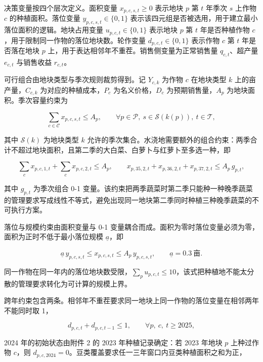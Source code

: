 \documentclass[bwprint]{gmcmthesis}
\begin{document}
决策变量按四个层次定义。面积变量 $x_{p,c,s,t}\ge 0$ 表示地块 $p$ 第 $t$ 年季次 $s$ 上作物 $c$ 的种植面积。落位变量 $y_{p,c,s,t}\in\{0,1\}$ 表示该四元组是否被选用，用于建立最小落位面积的逻辑。地块占用变量 $u_{p,c,t}\in\{0,1\}$ 表示地块 $p$ 第 $t$ 年是否种植作物 $c$，用于限制同一作物的落位地块数。轮作变量 $d_{p,c,t}\in\{0,1\}$ 表示作物 $c$ 第 $t$ 年是否落在地块 $p$ 上，用于表达相邻年不重茬。销售侧变量为正常销售量 $q_{c,t}$、超产量 $e_{c,t}$ 与销售收益 $r_{c,t}$。

可行组合由地块类型与季次规则裁剪得到。记 $Y_{c,k}$ 为作物 $c$ 在地块类型 $k$ 上的亩产量，$C_{c,k}$ 为对应的种植成本，$P_c$ 为名义价格，$D_c$ 为预期销售量，$A_p$ 为地块面积。季次容量约束为

\begin{equation}
\sum_{c\in\mathcal{C}} x_{p,c,s,t}\le A_p,\qquad \forall p\in\mathcal{P},\ s\in\mathcal{S}(k(p)),\ t\in\mathcal{T},
\end{equation}

其中 $\mathcal{S}(k)$ 为地块类型 $k$ 允许的季次集合。水浇地需要额外的组合约束：两季合计不超过地块面积，且第二季的大白菜、白萝卜与红萝卜至多选一种，即

\begin{equation}
\sum_{c} x_{p,c,1,t}+\sum_{c} x_{p,c,2,t}\le A_p,\qquad x_{p,35,2,t}+x_{p,36,2,t}+x_{p,37,2,t}\le A_p\, g_{p,t},
\end{equation}

其中 $g_{p,t}$ 为季次组合 0-1 变量。该约束把两季蔬菜时第二季只能种一种晚季蔬菜的管理要求写成线性不等式，避免出现同一地块第二季同时种植三种晚季蔬菜的不可执行方案。

落位与规模约束由面积变量与 0-1 变量耦合而成。面积为零时落位变量必须为零，面积为正时不低于最小落位规模 $\underline{a}$，即

\begin{equation}
\underline{a}\, y_{p,c,s,t}\le x_{p,c,s,t}\le A_p\, y_{p,c,s,t},\qquad \underline{a}=0.3\ \text{亩}.
\end{equation}

同一作物在同一年内的落位地块数受限，$\sum_{p}u_{p,c,t}\le 10$，该式把种植地不能太分散的管理要求转化为可计算的规模上界。

跨年约束包含两条。相邻年不重茬要求同一地块上同一作物的落位变量在相邻两年不能同时取 1，

\begin{equation}
d_{p,c,t}+d_{p,c,t-1}\le 1,\qquad \forall p,\ c,\ t\ge 2025,
\end{equation}

2024 年的初始状态由附件 2 的 2023 年种植记录确定：若 2023 年地块 $p$ 上种过作物 $c$，则 $d_{p,c,2024}=0$。豆类覆盖要求任一三年窗口内豆类种植面积之和为正，
\end{document}

